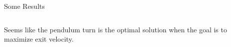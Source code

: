 \begin{frame}{Some Results}
\begin{columns}
\begin{column}{0.55\textwidth}
            \begin{alertblock}{}
                Seems like the pendulum turn is the optimal solution when the goal is to maximize exit velocity.
            \end{alertblock}
        \end{column}
    \end{columns}
\end{frame}